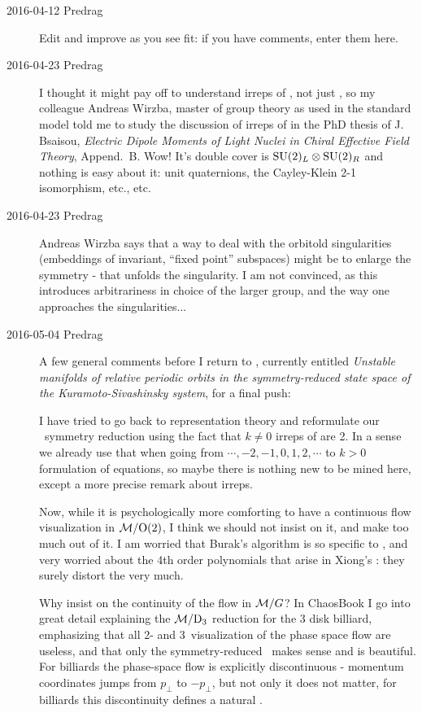 \begin{description}
\item[2016-04-12 Predrag]
  Edit and improve  as you see fit: if you have
  comments, enter them here.

\item[2016-04-23 Predrag] I thought it might pay off to understand irreps
of , not just , so my colleague Andreas Wirzba, master of
group theory as used in the standard model told me to study the discussion
of irreps of  in the PhD
thesis of J. Bsaisou, {\em Electric Dipole Moments of
Light Nuclei in Chiral Effective Field Theory}, Append.~B. Wow! It's
double cover is $\textrm{SU}(2)_L \otimes \textrm{SU}(2)_R$ and nothing is easy about it:
unit quaternions, the Cayley-Klein 2-1 isomorphism, etc., etc.

\item[2016-04-23 Predrag] Andreas Wirzba says that a way to deal with the
orbitold singularities (embeddings of invariant, ``fixed point''
subspaces) might be to enlarge the symmetry - that unfolds the
singularity. I am not convinced, as this introduces arbitrariness in
choice of the larger group, and the way one approaches the
singularities...

\item[2016-05-04 Predrag]
A few general comments before I return to , currently
entitled
{\em Unstable manifolds of relative periodic orbits in the
symmetry-reduced state space of the Kuramoto-Sivashinsky system},
for a final push:

I have tried to go back to  representation theory and reformulate
our \KS\ symmetry reduction using the fact that $k\neq0$ irreps of 
are 2\dmn. In a sense we already use that when going from
$\cdots,-2,-1,0,1,2,\cdots$ to $k>0$ formulation of equations, so maybe
there is nothing new to be mined here, except a more precise remark about
irreps.

Now, while it is psychologically more comforting to have a continuous
flow visualization in $\mathcal{M}/\textrm{O}(2)$, I think we should not insist on it,
and make too much out of it. I am worried that Burak's
algorithm is so specific to {\fFslice}, and very worried
about the 4th order polynomials that arise in Xiong's {\sFslice} : they surely distort the {\reducedsp} very
much.

Why insist on the continuity of the flow in $\mathcal{M}/G$? In ChaosBook I
go into great detail explaining the $\mathcal{M}/\textrm{D}_{3}$ reduction for the 3 disk
billiard, emphasizing that all 2- and 3\dmn\ visualization of the phase
space flow are useless, and that only the symmetry-reduced \PoincSec\
makes sense and is beautiful. For billiards the phase-space flow is
explicitly discontinuous - momentum coordinates jumps from $p_\perp$ to
$- p_\perp$, but not only it does not matter, for billiards this
discontinuity defines a natural \PoincSec.


\end{description}
